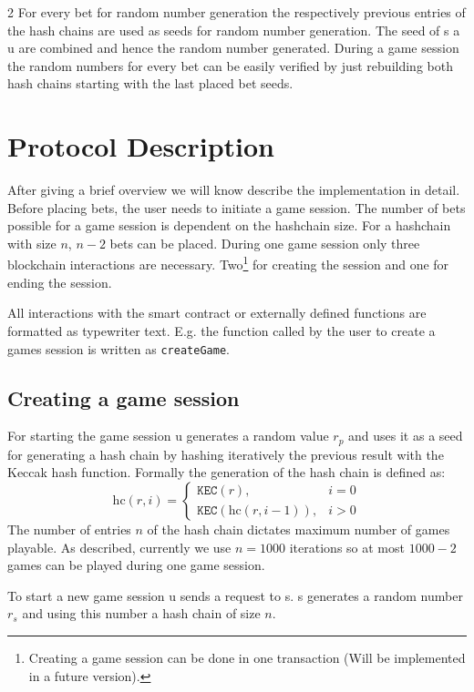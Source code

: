 \documentclass[oneside]{amsart}
\makeatletter
\newcommand*\Eg{E.g.\@\xspace}
\newcommand{\kec}{\texttt{KEC}}
\makeatother
\begin{document}
\begin{multicols}{2}
For every bet for random number generation the respectively  previous entries of the hash chains are used
as seeds for random number generation.
The seed of \gls{s} a \gls{u} are combined and hence the random number generated.
During a game session the random numbers for every bet can be easily verified by just rebuilding both hash chains
starting with the last placed bet seeds.

\section{Protocol Description}\label{sec:protocolDescription}
After giving a brief overview we will know describe the implementation in detail.
Before placing bets, the user needs to initiate a game session.
The number of bets possible for a game session is dependent on the hashchain size.
For a hashchain with size $n$, $n - 2$ bets can be placed.
During one game session only three blockchain interactions are necessary.
Two\footnote{Creating a game session can be done in one transaction (Will be implemented in a future version).}
for creating the session and one for ending the session.

All interactions with the smart contract or externally defined functions are formatted as typewriter text.
\Eg the function called by the user to create a games session is written as \texttt{createGame}.

\subsection{Creating a game session}\label{subsec:creatingGameSession}
For starting the game session \gls{u} generates a random value $r_p$ and uses it as a seed for generating a hash chain by hashing iteratively the
previous result with the Keccak hash function.
Formally the generation of the hash chain is defined as:
\begin{equation}
    \text{hc}(r, i) =
    \begin{cases}
        \kec(r), & i = 0 \\
        \kec(\text{hc}(r, i-1)), & i > 0
    \end{cases}
\end{equation}
The number of entries $n$ of the hash chain dictates maximum number of games playable.
As described, currently we use $n = 1000$ iterations so at most $1000 - 2$ games can be played during one game session.

To start a new game session \gls{u} sends a request to \gls{s}.
\Gls{s} generates a random number $r_s$ and using this number a hash chain of size $n$.


\end{multicols}
\end{document}
